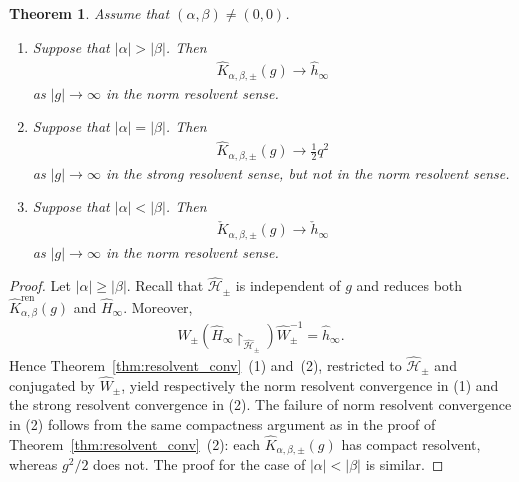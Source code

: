 \documentclass[12pt,dvipdfmx]{article}
\newtheorem{theorem}{Theorem}[section]
\newcommand{\cH}{\mathcal{H}}
\begin{document}
\begin{theorem}\label{thm:parity-reduction}
Assume that $(\alpha,\beta)\ne(0,0)$.
\begin{enumerate}
\item[(1)]
Suppose that $|\alpha|>|\beta|$. Then 
\begin{align*}
\hat{K}_{\alpha,\beta,\pm}(g)\longrightarrow
\hat{h}_\infty
\end{align*}
as $|g|\to\infty$ in the norm resolvent sense.

\item[(2)]
Suppose that $|\alpha|=|\beta|$. Then
\begin{align*}
  \hat{K}_{\alpha,\beta,\pm}(g)\longrightarrow   \frac12 q^2
\end{align*}
as $|g|\to\infty$
in the strong resolvent sense, but not in the norm resolvent sense.

\item[(3)]
Suppose that $|\alpha|<|\beta|$. Then
\begin{align*}
\check{K}_{\alpha,\beta,\pm}(g)\longrightarrow
\check{h}_\infty
\end{align*}
as $|g|\to\infty$ in the norm resolvent sense.
\end{enumerate}
\end{theorem}
%
\begin{proof}
Let $|\alpha|\ge|\beta|$.
Recall that $\hat{\cH} _\pm$ is independent of $g$ and reduces both
$\hat{K}_{\alpha,\beta}^{\mathrm{ren} }(g)$ and $\hat{H}_\infty$. Moreover,
\begin{align*}
    \hat{W}_\pm
    \left(
        \hat{H}_\infty \upharpoonright_{\hat{\cH} _\pm}
    \right)
    \hat{W}_\pm^{-1}
    =
    \hat{h}_\infty.
\end{align*}
Hence Theorem~\ref{thm:resolvent_conv}~(1) and~(2), restricted to
$\hat{\cH} _\pm$ and conjugated by $\hat{W}_\pm$, yield respectively the norm resolvent convergence in (1) and the strong resolvent convergence in (2). The failure of norm resolvent convergence in (2) follows from the same compactness argument as in the proof of Theorem~\ref{thm:resolvent_conv}~(2): each $\hat{K}_{\alpha,\beta,\pm}(g)$ has compact resolvent, whereas $g^2/2$ does not.
The proof for the case of 
$|\alpha|<|\beta|$ is similar. 
\end{proof}
%
%
\end{document}
